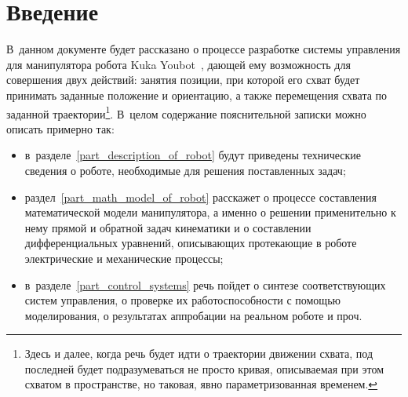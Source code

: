 \section*{Введение}
В~данном документе будет рассказано о процессе разработке системы управления для манипулятора робота Kuka Youbot~\cite{technomatix_kuka_youbot}, дающей ему возможность для совершения двух действий: занятия позиции, при которой его схват будет принимать заданные положение и ориентацию, а также перемещения схвата по заданной траектории\footnote{Здесь и далее, когда речь будет идти о траектории движении схвата, под последней будет подразумеваться не просто кривая, описываемая при этом схватом в пространстве, но таковая, явно параметризованная временем.}.
В~целом содержание пояснительной записки можно описать примерно так:
\begin{itemize}
\item в~разделе~\ref{part_description_of_robot} будут приведены технические сведения о роботе, необходимые для решения поставленных задач;
\item раздел~\ref{part_math_model_of_robot} расскажет о процессе составления математической модели манипулятора, а именно о решении применительно к нему прямой и обратной задач кинематики и о составлении дифференциальных уравнений, описывающих протекающие в роботе электрические и механические процессы;
\item в~разделе~\ref{part_control_systems} речь пойдет о синтезе соответствующих систем управления, о проверке их работоспособности с помощью моделирования, о результатах аппробации на реальном роботе и проч.
\end{itemize}
\newpage
